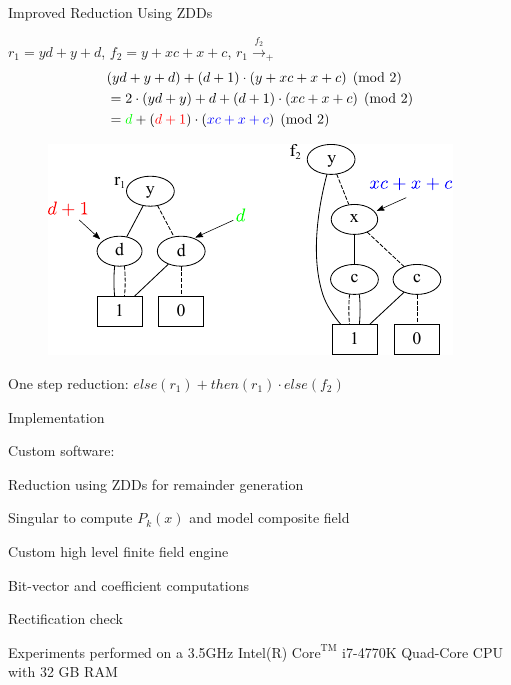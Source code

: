 \begin{frame}{\large{Improved Reduction Using ZDDs}}
\bi
  \item $r_1=yd + y + d$, $f_2=y + xc + x + c$, $r_1 \xrightarrow{f_2}_+$
        {\small
        \begin{align*}
          & (yd + y + d) + (d + 1)\cdot(y + xc + x + c) \pmod{2}\\
          &= 2\cdot(yd + y) + d + (d+1)\cdot(xc + x + c) \pmod{2}\\
          &= \textcolor{green}{d} + (\textcolor{red}{d+1})\cdot(\textcolor{blue}{xc + x + c})  \pmod{2}
        \end{align*}
        }
\ei
\begin{figure}[hbt]
\centering
\includegraphics[scale=0.9]{r1_f2_2.pdf}
\label{f2}
\end{figure}
\bi
  \item One step reduction: $else(r_1) + then(r_1)\cdot else(f_2)$
\ei
\end{frame}

\begin{frame}{\large Implementation}
\bi
	\item Custom software: 
	\bi
		\pause
		\vspace{0.1in}
		\item Reduction using ZDDs for remainder generation
		\vspace{0.1in}
		\pause
		\item Singular to compute $P_k(x)$ and model composite field
		\vspace{0.1in}
		\pause
		\item Custom high level finite field engine 
		\pause
		\bi
		\item Bit-vector and coefficient computations
		\item Rectification check
		\ei
	\ei
	\pause
	\item Experiments performed on a 3.5GHz 
	Intel(R) $\text{Core}^{\text{TM}}$ i7-4770K Quad-Core CPU with 32 GB RAM
\ei
\end{frame}

